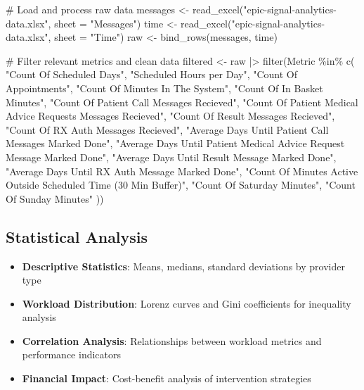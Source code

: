 \documentclass[
  11pt,
]{article}
\newenvironment{Shaded}{\begin{snugshade}}{\end{snugshade}}
\newcommand{\AttributeTok}[1]{\textcolor[rgb]{0.40,0.45,0.13}{#1}}
\newcommand{\CommentTok}[1]{\textcolor[rgb]{0.37,0.37,0.37}{#1}}
\newcommand{\FunctionTok}[1]{\textcolor[rgb]{0.28,0.35,0.67}{#1}}
\newcommand{\NormalTok}[1]{\textcolor[rgb]{0.00,0.23,0.31}{#1}}
\newcommand{\OtherTok}[1]{\textcolor[rgb]{0.00,0.23,0.31}{#1}}
\newcommand{\SpecialCharTok}[1]{\textcolor[rgb]{0.37,0.37,0.37}{#1}}
\newcommand{\StringTok}[1]{\textcolor[rgb]{0.13,0.47,0.30}{#1}}
\providecommand{\tightlist}{%
  \setlength{\itemsep}{0pt}\setlength{\parskip}{0pt}}\usepackage{longtable,booktabs,array}
\begin{document}
\begin{Shaded}
\begin{Highlighting}[]
\CommentTok{\# Load and process raw data}
\NormalTok{messages }\OtherTok{\textless{}{-}} \FunctionTok{read\_excel}\NormalTok{(}\StringTok{"epic{-}signal{-}analytics{-}data.xlsx"}\NormalTok{, }\AttributeTok{sheet =} \StringTok{"Messages"}\NormalTok{)}
\NormalTok{time }\OtherTok{\textless{}{-}} \FunctionTok{read\_excel}\NormalTok{(}\StringTok{"epic{-}signal{-}analytics{-}data.xlsx"}\NormalTok{, }\AttributeTok{sheet =} \StringTok{"Time"}\NormalTok{)}
\NormalTok{raw }\OtherTok{\textless{}{-}} \FunctionTok{bind\_rows}\NormalTok{(messages, time)}

\CommentTok{\# Filter relevant metrics and clean data}
\NormalTok{filtered }\OtherTok{\textless{}{-}}\NormalTok{ raw }\SpecialCharTok{|\textgreater{}}
  \FunctionTok{filter}\NormalTok{(Metric }\SpecialCharTok{\%in\%} \FunctionTok{c}\NormalTok{(}
    \StringTok{"Count Of Scheduled Days"}\NormalTok{,}
    \StringTok{"Scheduled Hours per Day"}\NormalTok{, }
    \StringTok{"Count Of Appointments"}\NormalTok{,}
    \StringTok{"Count Of Minutes In The System"}\NormalTok{,}
    \StringTok{"Count Of In Basket Minutes"}\NormalTok{,}
    \StringTok{"Count Of Patient Call Messages Recieved"}\NormalTok{,}
    \StringTok{"Count Of Patient Medical Advice Requests Messages Recieved"}\NormalTok{,}
    \StringTok{"Count Of Result Messages Recieved"}\NormalTok{,}
    \StringTok{"Count Of RX Auth Messages Recieved"}\NormalTok{,}
    \StringTok{"Average Days Until Patient Call Messages Marked Done"}\NormalTok{,}
    \StringTok{"Average Days Until Patient Medical Advice Request Message Marked Done"}\NormalTok{,}
    \StringTok{"Average Days Until Result Message Marked Done"}\NormalTok{,}
    \StringTok{"Average Days Until RX Auth Message Marked Done"}\NormalTok{,}
    \StringTok{"Count Of Minutes Active Outside Scheduled Time (30 Min Buffer)"}\NormalTok{,}
    \StringTok{"Count Of Saturday Minutes"}\NormalTok{,}
    \StringTok{"Count Of Sunday Minutes"}
\NormalTok{  ))}
\end{Highlighting}
\end{Shaded}

\subsection{Statistical Analysis}\label{statistical-analysis}

\begin{itemize}
\tightlist
\item
  \textbf{Descriptive Statistics}: Means, medians, standard deviations
  by provider type
\item
  \textbf{Workload Distribution}: Lorenz curves and Gini coefficients
  for inequality analysis
\item
  \textbf{Correlation Analysis}: Relationships between workload metrics
  and performance indicators
\item
  \textbf{Financial Impact}: Cost-benefit analysis of intervention
  strategies
\end{itemize}
\end{document}
